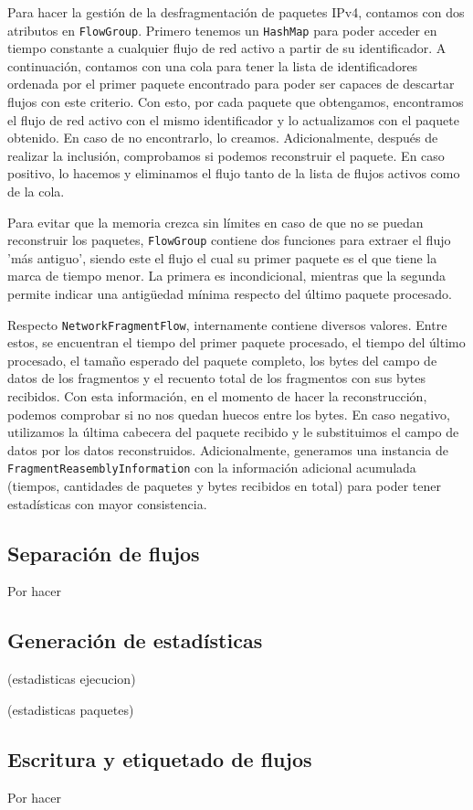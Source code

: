 Para hacer la gestión de la desfragmentación de paquetes IPv4, contamos con dos atributos en \texttt{FlowGroup}. Primero tenemos un \texttt{HashMap} para poder acceder en tiempo constante a cualquier flujo de red activo a partir de su identificador. A continuación, contamos con una cola para tener la lista de identificadores ordenada por el primer paquete encontrado para poder ser capaces de descartar flujos con este criterio. Con esto, por cada paquete que obtengamos, encontramos el flujo de red activo con el mismo identificador y lo actualizamos con el paquete obtenido. En caso de no encontrarlo, lo creamos. Adicionalmente, después de realizar la inclusión, comprobamos si podemos reconstruir el paquete. En caso positivo, lo hacemos y eliminamos el flujo tanto de la lista de flujos activos como de la cola.

Para evitar que la memoria crezca sin límites en caso de que no se puedan reconstruir los paquetes, \texttt{FlowGroup} contiene dos funciones para extraer el flujo 'más antiguo', siendo este el flujo el cual su primer paquete es el que tiene la marca de tiempo menor. La primera es incondicional, mientras que la segunda permite indicar una antigüedad mínima respecto del último paquete procesado. 

Respecto \texttt{NetworkFragmentFlow}, internamente contiene diversos valores. Entre estos, se encuentran el tiempo del primer paquete procesado, el tiempo del último procesado, el tamaño esperado del paquete completo, los bytes del campo de datos de los fragmentos y el recuento total de los fragmentos con sus bytes recibidos. Con esta información, en el momento de hacer la reconstrucción, podemos comprobar si no nos quedan huecos entre los bytes. En caso negativo, utilizamos la última cabecera del paquete recibido y le substituimos el campo de datos por los datos reconstruidos. Adicionalmente, generamos una instancia de \texttt{FragmentReasemblyInformation} con la información adicional acumulada (tiempos, cantidades de paquetes y bytes recibidos en total) para poder tener estadísticas con mayor consistencia.

\subsection{Separación de flujos} \label{flowseparation}

Por hacer

\subsection{Generación de estadísticas}

(estadisticas ejecucion)

(estadisticas paquetes)

\subsection{Escritura y etiquetado de flujos}

Por hacer

